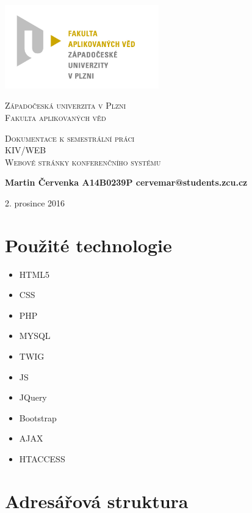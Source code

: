 \documentclass[a4paper]{article}
\begin{document}
	\begin{titlepage}
		\includegraphics[width=0.5\textwidth]{logo.jpg}
		\par
		\centering
		\vspace{1cm}
		{\scshape\LARGE Z\'apado\v{c}esk\'a univerzita v Plzni\\Fakulta aplikovan\'ych v\v{e}d \par}
		\vspace{1cm}
		{\scshape\Huge Dokumentace k semestr\'aln\'i pr\'aci\\KIV/WEB\\Webov\'e str\'anky konferen\v{c}n\'iho
		syst\'emu \par}
		\vspace{1.5cm}
		{\Large\bfseries Martin \v{C}ervenka A14B0239P cervemar@students.zcu.cz \par}
		\vfill
		{\large 2. prosince 2016\par}
	\end{titlepage}
	\section{Pou\v{z}it\'e technologie}
		\begin{itemize}
			\item{HTML5}
			\item{CSS}
			\item{PHP}
			\item{MYSQL}
			\item{TWIG}
			\item{JS}
			\item{JQuery}
			\item{Bootstrap}
			\item{AJAX}
			\item{HTACCESS}
		\end{itemize}
	\clearpage

	\section{Adres\'a\v{r}ov\'a struktura}
\end{document}
